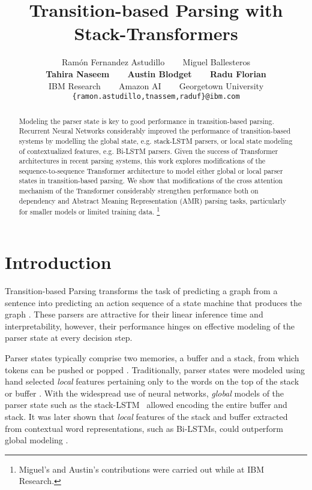 \documentclass[11pt,a4paper]{article}
\title{Transition-based Parsing with Stack-Transformers}
\author{Ram\'{o}n Fernandez Astudillo ~~~ Miguel Ballesteros \\ \textbf{Tahira Naseem} ~~~ 
\textbf{Austin Blodget} ~~~ \textbf{Radu Florian}\\
IBM Research ~~~ Amazon AI ~~~ 
Georgetown University\\
\texttt{\footnotesize{\{ramon.astudillo,tnassem,raduf\}@ibm.com}}}
\date{}
\newcommand\blfootnote[1]{\begingroup
  \renewcommand\thefootnote{}\footnote{#1}\addtocounter{footnote}{-1}\endgroup
}
\begin{document}
\maketitle
\begin{abstract}
Modeling the parser state is key to good performance in transition-based parsing. Recurrent Neural Networks considerably improved the performance of transition-based systems by modelling the global state, e.g. stack-LSTM parsers, or local state modeling of contextualized features, e.g. Bi-LSTM parsers. Given the success of Transformer architectures in recent parsing systems, this work explores modifications of the sequence-to-sequence Transformer architecture to model either global or local parser states in transition-based parsing. We show that modifications of the cross attention mechanism of the Transformer considerably strengthen performance both on dependency and Abstract Meaning Representation (AMR) parsing tasks, particularly for smaller models or limited training data.\blfootnote{Miguel's and Austin's contributions were carried out while at IBM Research.}
\end{abstract}

\section{Introduction}
\label{section:intro}

Transition-based Parsing transforms the task of predicting a graph from a sentence into predicting an action sequence of a state machine that produces the graph \cite{nivre2003efficient,nivre2004incrementality,Kubler:2009:DP:1538443,Henderson:2013:MJP:2576217.2576223}. These parsers are attractive for their linear inference time and interpretability, however, their performance hinges on effective modeling of the parser state at every decision step. 

Parser states typically comprise two memories, a buffer and a stack, from which tokens can be pushed or popped \cite{Kubler:2009:DP:1538443}. Traditionally, parser states were modeled using hand selected \textit{local} features pertaining only to the words on the top of the stack or buffer \cite[inter-alia]{nivre2007maltparser,zhang-nivre-2011-transition}. With the widespread use of neural networks, \textit{global} models of the parser state such as the stack-LSTM~\cite{dyer2015transition} allowed encoding the entire buffer and stack. It was later shown that \textit{local} features of the stack and buffer extracted from contextual word representations, such as Bi-LSTMs, could outperform global modeling \cite{kiperwasser-goldberg-2016-simple,dozat2016deep}.
\end{document}
